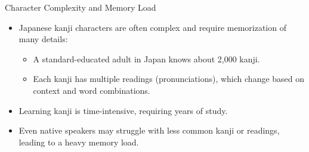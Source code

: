 \documentclass[xetex]{beamer}
\begin{document}


\begin{frame}{Character Complexity and Memory Load}
\begin{itemize}
    \item Japanese kanji characters are often complex and require memorization of many details:
    \begin{itemize}
        \item A standard-educated adult in Japan knows about 2,000 kanji.
        \item Each kanji has multiple readings (pronunciations), which change based on context and word combinations.
    \end{itemize}
    \item Learning kanji is time-intensive, requiring years of study.
    \item Even native speakers may struggle with less common kanji or readings, leading to a heavy memory load.
\end{itemize}
\end{frame}
\end{document}
